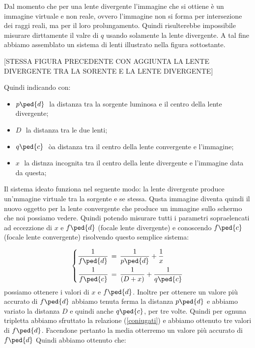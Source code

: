 Dal momento che per una lente divergente l'immagine che si ottiene è un immagine virtuale e non reale, ovvero l'immagine non si forma per intersezione dei raggi reali, ma per il loro prolungamento. Quindi risulterebbe impossibile misurare dirttamente il valre di $q$ usando solamente la lente divergente.
A tal fine abbiamo assemblato un sistema di lenti illustrato nella figura sottostante.

[STESSA FIGURA PRECEDENTE CON AGGIUNTA LA LENTE DIVERGENTE TRA LA SORENTE E LA LENTE DIVERGENTE]

Quindi indicando con:
\begin{itemize}
	\item{$p\ped{d}\,\,$ la distanza tra la sorgente luminosa e il centro della lente divergente;}
	\item{$D\,\,$ la distanza tra le due lenti;}
	\item{$q\ped{c}\,\,$ òa distanza tra il centro della lente convergente e l'immagine;}
	\item{$x\,\,$ la distnza incognita tra il centro della lente divergente e l'immagine data da questa;}
\end{itemize}
Il sistema ideato funziona nel seguente modo: la lente divergente produce un'mmagine virtuale tra la sorgente e se stessa. Qusta immagine diventa quindi il nuovo oggetto per la lente convergente che produce un immagine sullo schermo che noi possiamo vedere. Quindi potendo misurare tutti i parametri sopraelencati ad eccezzione di $x$ e $f\ped{d}$ (focale lente divergente) e conoscendo $f\ped{c}$ (focale lente convergente) risolvendo questo semplice sistema:

\begin{equation}
 \left\{
  \begin{aligned}
    \frac{1}{f\ped{d}} & \,=\, \frac{1}{p\ped{d}} + \frac{1}{x}\\
    \frac{1}{f\ped{c}} & \,=\, \frac{1}{(D + x)} + \frac{1}{q\ped{c}}
  \end{aligned}
\right.
\end{equation}
%
possiamo ottenere i valori di $x$ e $f\ped{d}$. Inoltre per ottenere un valore più accurato di $f\ped{d}$ abbiamo tenuta ferma la distanza $p\ped{d}$ e abbiamo variato la distanza $D$ e quindi anche $q\ped{c}$, per tre volte. Quindi per ognuna tripletta abbiamo sfruttato la relazione (\ref{coniugati}) e abbiamo ottenuto tre valori di $f\ped{d}$. Facendone pertanto la media otterremo un valore più accurato di $f\ped{d}$
Quindi abbiamo ottenuto che:

